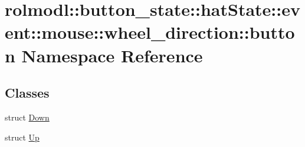 \hypertarget{namespacerolmodl_1_1button__state_1_1hat_state_1_1event_1_1mouse_1_1wheel__direction_1_1button}{}\section{rolmodl\+::button\+\_\+state\+::hat\+State\+::event\+::mouse\+::wheel\+\_\+direction\+::button Namespace Reference}
\label{namespacerolmodl_1_1button__state_1_1hat_state_1_1event_1_1mouse_1_1wheel__direction_1_1button}
\subsection*{Classes}
\begin{DoxyCompactItemize}
\item 
struct \mbox{\hyperlink{structrolmodl_1_1button__state_1_1hat_state_1_1event_1_1mouse_1_1wheel__direction_1_1button_1_1_down}{Down}}
\item 
struct \mbox{\hyperlink{structrolmodl_1_1button__state_1_1hat_state_1_1event_1_1mouse_1_1wheel__direction_1_1button_1_1_up}{Up}}
\end{DoxyCompactItemize}

